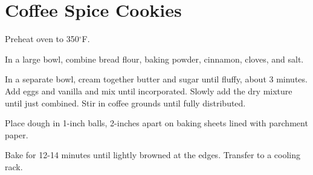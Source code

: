 \section{Coffee Spice Cookies}
\begin{recipe}
	
	
	
	Preheat oven to 350$^{\circ}$F.
	
	In a large bowl, combine bread flour, baking powder, cinnamon, cloves, and salt.
	
	In a separate bowl, cream together butter and sugar until fluffy, about 3 minutes. Add eggs and vanilla and mix until incorporated. Slowly add the dry mixture until just combined. Stir in coffee grounds until fully distributed.
	
	Place dough in 1-inch balls, 2-inches apart on baking sheets lined with parchment paper.
	
	Bake for 12-14 minutes until lightly browned at the edges. Transfer to a cooling rack.	
\end{recipe}
